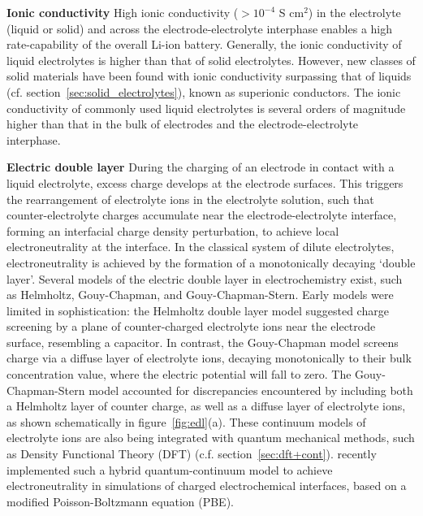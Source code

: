 \documentclass[../main.tex]{subfiles}
\begin{document}
\textbf{Ionic conductivity} High ionic conductivity ($>10^{-4}$ S cm$^2$) in the electrolyte (liquid or solid) and across the electrode-electrolyte interphase enables a high rate-capability of the overall Li-ion battery.\cite{park2010review,Goodenough2010,Kamaya2011} Generally, the ionic conductivity of liquid electrolytes is higher than that of solid electrolytes. However, new classes of solid materials have been found with ionic conductivity surpassing that of liquids (cf. section~\ref{sec:solid_electrolytes}), known as superionic conductors. The ionic conductivity of commonly used liquid electrolytes is several orders of magnitude higher than that in the bulk of electrodes and the electrode-electrolyte interphase.\cite{park2010review}

\textbf{Electric double layer} During the charging of an electrode in contact with a liquid electrolyte, excess charge develops at the electrode surfaces. This triggers the rearrangement of electrolyte ions in the electrolyte solution, such that counter-electrolyte charges accumulate near the electrode-electrolyte interface, forming an interfacial charge density perturbation, to achieve local electroneutrality at the interface. In the classical system of dilute electrolytes, electroneutrality is achieved by the formation of a monotonically decaying `double layer'.\cite{Schmickler2010} Several models of the electric double layer in electrochemistry exist, such as Helmholtz, Gouy-Chapman, and Gouy-Chapman-Stern.\cite{Bard2010} Early models were limited in sophistication: the Helmholtz double layer model suggested charge screening by a plane of counter-charged electrolyte ions near the electrode surface, resembling a capacitor. In contrast, the Gouy-Chapman model screens charge via a diffuse layer of electrolyte ions, decaying monotonically to their bulk concentration value, where the electric potential will fall to zero. The Gouy-Chapman-Stern model accounted for discrepancies encountered by including both a Helmholtz layer of counter charge, as well as a diffuse layer of electrolyte ions, as shown schematically in figure~\ref{fig:edl}(a). These continuum models of electrolyte ions are also being integrated with quantum mechanical methods, such as Density Functional Theory (DFT) (c.f. section~\ref{sec:dft+cont}). \citeauthor{neutralization-paper} recently implemented such a hybrid quantum-continuum model to achieve electroneutrality in simulations of charged electrochemical interfaces, based on a modified Poisson-Boltzmann equation (PBE).\cite{neutralization-paper}
\end{document}
